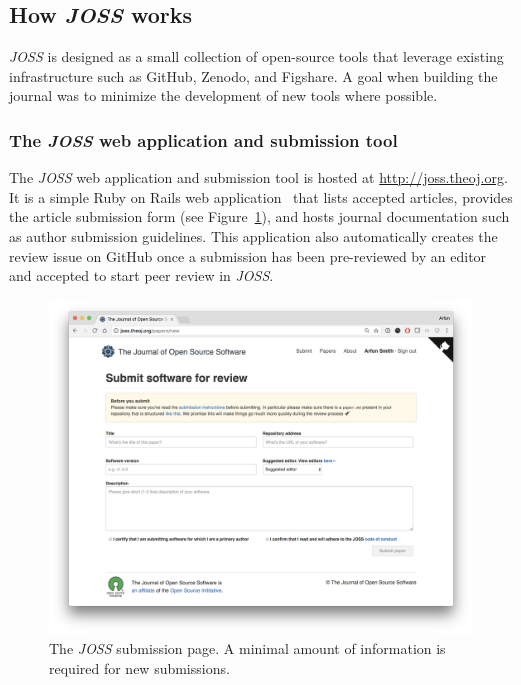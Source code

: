 \documentclass{article}
\newcommand\joss{\textit{JOSS}}
\begin{document}
\subsection{How \joss{} works}\label{howitworks}

\joss{} is designed as a small collection of open-source tools that leverage existing infrastructure such as GitHub, Zenodo, and Figshare. A goal when building the journal was to minimize the development of new tools where possible.

\subsubsection*{The \joss{} web application and submission tool}

The \joss{} web application and submission tool is hosted at \href{http://joss.theoj.org}{http://joss.theoj.org}. It is a simple Ruby on Rails web application~\cite{joss-site} that lists accepted articles, provides the article submission form (see Figure~\ref{fig:submission}), and hosts journal documentation such as author submission guidelines.
This application also automatically creates the review issue on GitHub once a submission has been pre-reviewed by an editor and accepted to start peer review in \joss{}.


\begin{figure}[t]
\centering
\includegraphics[width=1.0\textwidth]{submission.png}
\caption{The \joss{} submission page. A minimal amount of information is required for new submissions.
\label{fig:submission}}
\end{figure}
\end{document}
